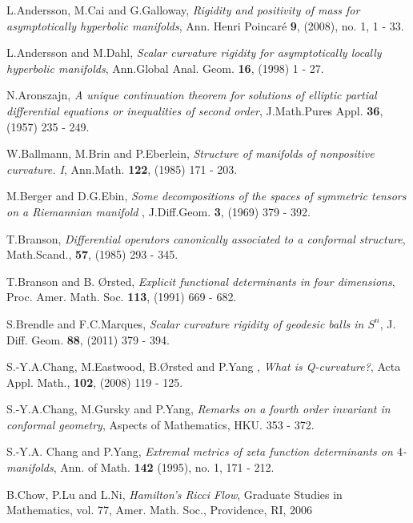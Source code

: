 \documentclass[12pt]{amsart}
\theoremstyle{definition}
\theoremstyle{remark}
\numberwithin{equation}{section}
\begin{document}

\begin{thebibliography}{10}

 L.Andersson, M.Cai and G.Galloway, \textit{Rigidity and positivity of mass for asymptotically hyperbolic manifolds},  
Ann. Henri Poincar\'{e} \textbf{9}, (2008), no. 1, 1 - 33. 

 L.Andersson and M.Dahl, \textit{Scalar curvature rigidity for asymptotically locally hyperbolic manifolds}, Ann.Global Anal. Geom. \textbf{16}, (1998) 1 - 27.

 N.Aronszajn, \textit{A unique continuation theorem for solutions of elliptic partial differential equations or inequalities of second order}, J.Math.Pures Appl. \textbf{36}, (1957) 235 - 249. 

 W.Ballmann, M.Brin and P.Eberlein, \textit{Structure of manifolds of nonpositive curvature. I}, Ann.Math. \textbf{122}, (1985) 171 - 203. 

 M.Berger and D.G.Ebin, \textit{Some decompositions of the spaces of symmetric tensors
on a Riemannian manifold }, J.Diff.Geom. \textbf{3}, (1969) 379 - 392. 

 T.Branson, \textit{Differential operators canonically associated to a conformal structure}, Math.Scand., \textbf{57}, (1985) 293 - 345. 

 T.Branson and B. \O rsted, \textit{Explicit functional determinants in four dimensions}, Proc. Amer. Math. Soc. \textbf{113}, (1991) 669 - 682. 

 S.Brendle and F.C.Marques, \textit{Scalar curvature rigidity of geodesic balls in $S^n$}, J. Diff. Geom. \textbf{88}, (2011) 379 - 394. 

 S.-Y.A.Chang, M.Eastwood, B.\O rsted and P.Yang , \textit{What is Q-curvature?}, Acta Appl. Math., \textbf{102}, (2008) 119 - 125. 

 S.-Y.A.Chang, M.Gursky and P.Yang, \textit{Remarks on a fourth order invariant in conformal geometry}, Aspects of Mathematics, HKU. 353 - 372.

 S.-Y.A. Chang and P.Yang, \textit{Extremal metrics of zeta function determinants on {$4$}-manifolds}, Ann. of Math. \textbf{142} (1995),  no. 1, 171 - 212. 

 B.Chow, P.Lu and L.Ni, \textit{Hamilton's Ricci Flow}, Graduate Studies in Mathematics, vol. 77, Amer. Math. Soc., Providence, RI, 2006


\end{thebibliography}
\end{document}
